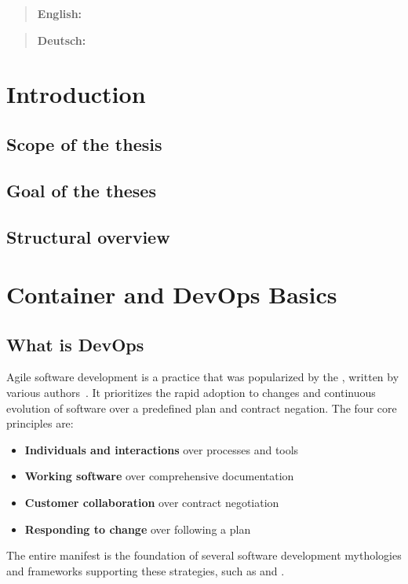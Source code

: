 \documentclass[12pt, a4paper]{article}
\begin{document}


\tableofcontents
{}
\setcounter{lastroman}{\value{page}}

\maketitle
\begin{abstract}
    \textbf{English:} \lipsum[20]
\end{abstract}
\begin{abstract}
    \textbf{Deutsch:} \lipsum[20]
\end{abstract}
\newpage
\section{ Introduction}
    \subsection{Scope of the thesis}
    \subsection{Goal of the theses}
    \subsection{Structural overview}
    \newpage
\section{Container and DevOps Basics}
    \subsection{What is DevOps}
    Agile software development is a practice that was popularized by the , written by various authors~\cite{manifesto}. It prioritizes the rapid adoption to changes and continuous evolution of software over a predefined plan and contract negation.
    The four core principles are:
    \begin{itemize}[label=\(\star\)]
        \item \textbf{Individuals and interactions} over processes and tools
        \item \textbf{Working software} over comprehensive documentation
        \item \textbf{Customer collaboration} over contract negotiation
        \item \textbf{Responding to change} over following a plan
    \end{itemize}
    The entire manifest is the foundation of several software development mythologies and frameworks supporting these strategies, such as  and .
\end{document}
